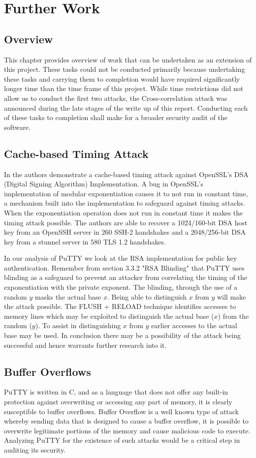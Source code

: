 \documentclass{bhamthesis}
\begin{document}
\chapter{Further Work}
\section{Overview}
This chapter provides overview of work that can be undertaken as an extension of this project. These tasks could not be conducted primarily because undertaking these tasks and carrying them to completion would have required significantly longer time than the time frame of this project. While time restrictions did not allow us to conduct the first two attacks, the Cross-correlation attack was announced during the late stages of the write up of this report. Conducting each of these tasks to completion shall make for a broader security audit of the software.
\section{Cache-based Timing Attack}
In \cite{garcia} the authors demonstrate a cache-based timing attack against OpenSSL's DSA (Digital Signing Algorithm) Implementation. A bug in OpenSSL's implementation of modular exponentiation causes it to not run in constant time, a mechanism built into the implementation to safeguard against timing attacks. When the exponentiation operation does not run in constant time it makes the timing attack possible. The authors are able to recover a 1024/160-bit DSA host key from an OpenSSH server in 260 SSH-2 handshakes and a 2048/256-bit DSA key from a stunnel server in 580 TLS 1.2 handshakes. \par 
In our analysis of PuTTY we look at the RSA implementation for public key authentication. Remember from section 3.3.2 "RSA Blinding" that PuTTY uses blinding as a safeguard to prevent an attacker from correlating the timing of the exponentiation with the private exponent. The blinding, through the use of a random \(y\) masks the actual base \(x\). Being able to distinguish \(x\) from \(y\) will make the attack possible. The FLUSH + RELOAD technique identifies accesses to memory lines which may be exploited to distinguish the actual base (\(x\)) from the random (\(y\)). To assist in distinguishing \(x\) from \(y\) earlier accesses to the actual base may be used. In conclusion there may be a possibility of the attack being successful and hence warrants further research into it.
\section{Buffer Overflows}
PuTTY is written in C, and as a language that does not offer any built-in protection against overwriting or accessing any part of memory, it is clearly susceptible to buffer overflows. Buffer Overflow is a well known type of attack whereby sending data that is designed to cause a buffer overflow, it is possible to overwrite legitimate portions of the memory and cause malicious code to execute. Analyzing PuTTY for the existence of such attacks would be a critical step in auditing its security. 
\end{document}

